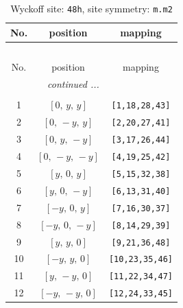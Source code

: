 \documentclass[fleqn,8pt]{jsarticle}
\begin{document}
\begin{longtable}{ccc}
\caption{Wyckoff site: {\tt 48h}, site symmetry: {\tt m.m2}}
 \\
 \hline \hline
No. & position & mapping \\ \hline \endfirsthead

\multicolumn{2}{l}{\tablename\ \thetable{}} \\
 \hline \hline
No. & position & mapping \\ \hline \endhead

 \hline \hline
\multicolumn{2}{r}{\footnotesize\it continued ...} \\ \endfoot

 \hline \hline
\multicolumn{2}{r}{} \\ \endlastfoot

1 & $\left[ 0,\, y,\, y \right]$ & {\tt [1,18,28,43]} \\ \hline
2 & $\left[ 0,\, - y,\, y \right]$ & {\tt [2,20,27,41]} \\ \hline
3 & $\left[ 0,\, y,\, - y \right]$ & {\tt [3,17,26,44]} \\ \hline
4 & $\left[ 0,\, - y,\, - y \right]$ & {\tt [4,19,25,42]} \\ \hline
5 & $\left[ y,\, 0,\, y \right]$ & {\tt [5,15,32,38]} \\ \hline
6 & $\left[ y,\, 0,\, - y \right]$ & {\tt [6,13,31,40]} \\ \hline
7 & $\left[ - y,\, 0,\, y \right]$ & {\tt [7,16,30,37]} \\ \hline
8 & $\left[ - y,\, 0,\, - y \right]$ & {\tt [8,14,29,39]} \\ \hline
9 & $\left[ y,\, y,\, 0 \right]$ & {\tt [9,21,36,48]} \\ \hline
10 & $\left[ - y,\, y,\, 0 \right]$ & {\tt [10,23,35,46]} \\ \hline
11 & $\left[ y,\, - y,\, 0 \right]$ & {\tt [11,22,34,47]} \\ \hline
12 & $\left[ - y,\, - y,\, 0 \right]$ & {\tt [12,24,33,45]} \\
\end{longtable}
\renewcommand{\arraystretch}{1.2}
\end{document}

